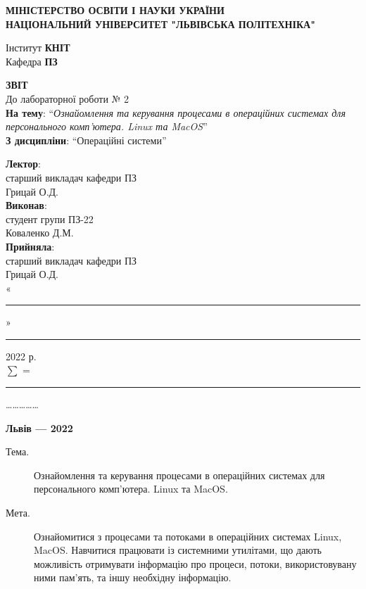 \documentclass{article}
\newcommand\subject{Операційні системи}
\newcommand\lecturer{старший викладач кафедри ПЗ\\Грицай О.Д.}
\newcommand\teacher{старший викладач кафедри ПЗ\\Грицай О.Д.}
\newcommand\mygroup{ПЗ-22}
\newcommand\lab{2}
\newcommand\theme{Ознайомлення та керування процесами в операційних системах для
	персонального комп’ютера. Linux та MacOS}
\newcommand\purpose{Ознайомитися з процесами та потоками в операційних системах
	Linux, MacOS. Навчитися працювати із системними утилітами, що дають
	можливість отримувати інформацію про процеси, потоки, використовувану
	ними пам'ять, та іншу необхідну інформацію}
\begin{document}
\begin{normalsize}
	\begin{titlepage}
		\thispagestyle{empty}
		\begin{center}
			\textbf{МІНІСТЕРСТВО ОСВІТИ І НАУКИ УКРАЇНИ\\
				НАЦІОНАЛЬНИЙ УНІВЕРСИТЕТ "ЛЬВІВСЬКА ПОЛІТЕХНІКА"}
		\end{center}
		\begin{flushright}
			Інститут \textbf{КНІТ}\\
			Кафедра \textbf{ПЗ}
		\end{flushright}
		\vspace{200pt}
		\begin{center}
			\textbf{ЗВІТ}\\
			\vspace{10pt}
			До лабораторної роботи № \lab\\
			\textbf{На тему}: “\textit{\theme}”\\
			\textbf{З дисципліни}: “\subject”
		\end{center}
		\vspace{112pt}
		\begin{flushright}
			
			\textbf{Лектор}:\\
			\lecturer\\
			\vspace{28pt}
			\textbf{Виконав}:\\
			
			студент групи \mygroup\\
			Коваленко Д.М.\\
			\vspace{28pt}
			\textbf{Прийняла}:\\
			
			\teacher\\
			
			\vspace{28pt}
			«\rule{1cm}{0.15mm}» \rule{1.5cm}{0.15mm} 2022 р.\\
			$\sum$ = \rule{1cm}{0.15mm}……………\\
			
		\end{flushright}
		\vspace{\fill}
		\begin{center}
			\textbf{Львів — 2022}
		\end{center}
	\end{titlepage}
		
	\begin{description}
		\item[Тема.] \theme.
		\item[Мета.] \purpose.
	\end{description}


\end{normalsize}
\end{document}
